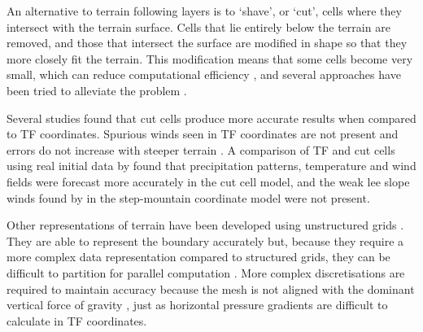 An alternative to terrain following layers is to `shave', or `cut', cells where they intersect with the terrain surface.  Cells that lie entirely below the terrain are removed, and those that intersect the surface are modified in shape so that they more closely fit the terrain.  This modification means that some cells become very small, which can reduce computational efficiency \autocite{klein2009}, and several approaches have been tried to alleviate the problem \parencites{steppeler2002}{yamazaki-satomura2010}{jebens2011}.

Several studies found that cut cells produce more accurate results when compared to TF coordinates.  Spurious winds seen in TF coordinates are not present and errors do not increase with steeper terrain \autocite{good2013}.  A comparison of TF and cut cells using real initial data by \textcite{steppeler2006} found that precipitation patterns, temperature and wind fields were forecast more accurately in the cut cell model, and the weak lee slope winds found by \textcite{gallus-klemp2000} in the step-mountain coordinate model were not present.  



Other representations of terrain have been developed using unstructured grids \parencites{ss2011}{others?}.  They are able to represent the boundary accurately but, because they require a more complex data representation compared to structured grids, they can be difficult to partition for parallel computation \autocite{steppeler2003}.  More complex discretisations are required to maintain accuracy because the mesh is not aligned with the dominant vertical force of gravity \autocite{rosatti2005}, just as horizontal pressure gradients are difficult to calculate in TF coordinates.

